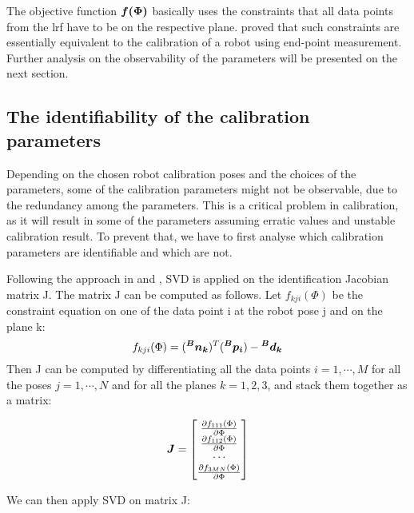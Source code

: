The objective function $\vb*{f(\Phi)}$ basically uses the constraints that all data points from the \ac{lrf} have to be on the respective plane. \cite{Zhuang1999} proved that such constraints are essentially equivalent to the calibration of a robot using end-point measurement. Further analysis on the observability of the parameters will be presented on the next section. 

\subsection{The identifiability of the calibration parameters}
\label{sec:third_step}

Depending on the chosen robot calibration poses and the choices of the parameters, some of the calibration parameters might not be observable, due to the redundancy among the parameters. This is a critical problem in calibration, as it will result in some of the parameters assuming erratic values and unstable calibration result. To prevent that, we have to first analyse which calibration parameters are identifiable and which are not. 

Following the approach in \cite{Hollerbach1996} and \cite{Joubair2015}, SVD is applied on the identification Jacobian matrix J. The matrix J can be computed as follows. Let  $f_{kji}(\Phi)$ be the constraint equation on one of the data point i at the robot pose j and on the plane k:
\begin{equation}
 f_{kji}(\Phi) =  (\vb*{{^B}n_k}) ^T (\vb*{{^B}p_i}) - \vb*{{^B}d_k}
\end{equation}
Then J can be computed by differentiating all the data points $i = 1, \cdots, M$ for all the poses $j = 1, \cdots, N$ and for all the planes $k=1,2,3$, and stack them together as a matrix:

\renewcommand\arraystretch{1.5}
\begin{equation}
\vb*{J} = \begin{bmatrix}
 \frac{\partial f_{111}(\Phi)}{\partial\Phi}\\
 \frac{\partial f_{112}(\Phi)}{\partial\Phi}\\
 \cdots \\
 \frac{\partial f_{3MN}(\Phi)}{\partial\Phi}\\
	\end{bmatrix}
\end{equation}

We can then apply SVD on matrix J:


